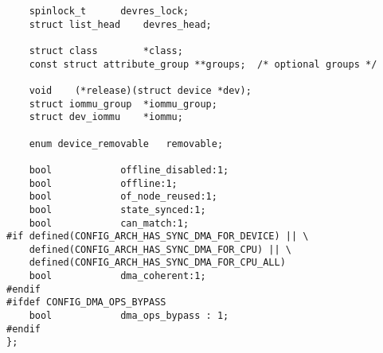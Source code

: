 \begin{lstlisting}
	spinlock_t		devres_lock;
	struct list_head	devres_head;

	struct class		*class;
	const struct attribute_group **groups;	/* optional groups */

	void	(*release)(struct device *dev);
	struct iommu_group	*iommu_group;
	struct dev_iommu	*iommu;

	enum device_removable	removable;

	bool			offline_disabled:1;
	bool			offline:1;
	bool			of_node_reused:1;
	bool			state_synced:1;
	bool			can_match:1;
#if defined(CONFIG_ARCH_HAS_SYNC_DMA_FOR_DEVICE) || \
    defined(CONFIG_ARCH_HAS_SYNC_DMA_FOR_CPU) || \
    defined(CONFIG_ARCH_HAS_SYNC_DMA_FOR_CPU_ALL)
	bool			dma_coherent:1;
#endif
#ifdef CONFIG_DMA_OPS_BYPASS
	bool			dma_ops_bypass : 1;
#endif
};
\end{lstlisting}
